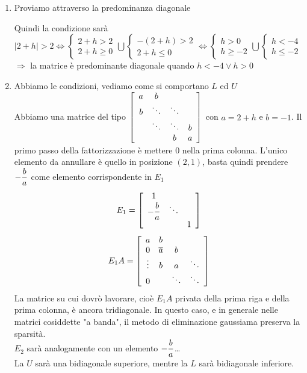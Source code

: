 \documentclass[10pt]{book}
\begin{document}
\begin{enumerate}
	\item Proviamo attraverso la predominanza diagonale
	\begin{list}{}{}
		\item[$i = 1$, $n \rightarrow$] $|2+h| > 1$
		\item[$i = 2\ldots n-1 \rightarrow$] $|2+h| > 2$
	\end{list}
	Quindi la condizione sarà $|2+h| > 2 \Leftrightarrow \left\{\begin{array}{l}
	2 + h > 2\\
	2 + h \geq 0
	\end{array}\right. \bigcup \left\{\begin{array}{l}
	-(2 + h) > 2\\
	2 + h \leq 0
	\end{array}\right. \Leftrightarrow \left\{\begin{array}{l}
	h > 0\\
	h \geq -2
	\end{array}\right. \bigcup \left\{\begin{array}{l}
	h < -4\\
	h \leq -2
	\end{array}\right.$\\
	$\Rightarrow$ la matrice è predominante diagonale quando $h < -4 \vee h > 0$
	\item Abbiamo le condizioni, vediamo come si comportano $L$ ed $U$\\
	Abbiamo una matrice del tipo $\left[\begin{array}{c c c c}
	a & b\\
	b & \ddots & \ddots\\
	& \ddots & \ddots & b\\
	& & b & a
\end{array}\right]$ con $a = 2+h$ e $b = -1$. Il primo passo della fattorizzazione è mettere $0$ nella prima colonna. L'unico elemento da annullare è quello in posizione $(2, 1)$, basta quindi prendere $\mathlarger{-\frac{b}{a}}$ come elemento corrispondente in $E_1$
$$E_1 = \left[\begin{array}{c c c}
1 & & \\
\mathlarger{-\frac{b}{a}} & \ddots\\
& & 1
\end{array} \right]$$
$$E_1 A = \left[\begin{array}{c c c c c}
a & b & &\\
0 & \overline{a} & b & \\
\vdots & b & a & \ddots\\
0 & & \ddots & \ddots
\end{array} \right]$$
La matrice su cui dovrò lavorare, cioè $E_1 A$ privata della prima riga e della prima colonna, è ancora tridiagonale. In questo caso, e in generale nelle matrici cosiddette "a banda", il metodo di eliminazione gaussiama preserva la sparsità.\\
$E_2$ sarà analogamente con un elemento $\mathlarger{-\frac{b}{a}}$\ldots\\
La $U$ sarà una bidiagonale superiore, mentre la $L$ sarà bidiagonale inferiore.
\end{enumerate}
\end{document}
